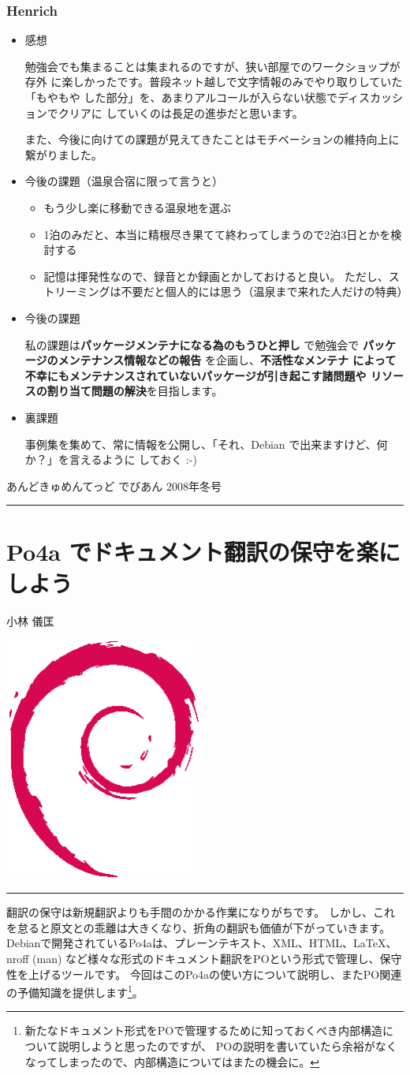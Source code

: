 \documentclass[mingoth,a4paper]{jsarticle}
\renewcommand{\dancersection}[2]{%
\newpage
あんどきゅめんてっど でびあん 2008年冬号
%
\vspace{0.1mm}\\
{\color{dancerlightblue}\rule{\hsize}{2mm}}

%
%
\begin{minipage}[t]{0.6\hsize}
\color{dancerdarkblue}
\vspace{1cm}
\section{#1}
\hfill{}#2\\
\end{minipage}
\begin{minipage}[t]{0.4\hsize}
\vspace{-2cm}
\hfill{}\includegraphics[height=8cm]{image200502/openlogo-nd.eps}\\
\vspace{-5cm}
\end{minipage}
%
%
{\color{dancerdarkblue}\rule{0.74\hsize}{2mm}}
%
\vspace{2cm}
}
\begin{document}
\subsubsection{Henrich}
\begin{itemize}
\item 感想

勉強会でも集まることは集まれるのですが、狭い部屋でのワークショップが存外
に楽しかったです。普段ネット越しで文字情報のみでやり取りしていた「もやもや
した部分」を、あまりアルコールが入らない状態でディスカッションでクリアに
していくのは長足の進歩だと思います。

また、今後に向けての課題が見えてきたことはモチベーションの維持向上に繋がりました。


\item 今後の課題（温泉合宿に限って言うと）

\begin{itemize}
\item もう少し楽に移動できる温泉地を選ぶ
\item 1泊のみだと、本当に精根尽き果てて終わってしまうので2泊3日とかを検討する
\item 記憶は揮発性なので、録音とか録画とかしておけると良い。
ただし、ストリーミングは不要だと個人的には思う（温泉まで来れた人だけの特典）
\end{itemize}

\item 今後の課題

私の課題は{\bf パッケージメンテナになる為のもうひと押し} で勉強会で
{\bf パッケージのメンテナンス情報などの報告} を企画し、{\bf 不活性なメンテナ
によって不幸にもメンテナンスされていないパッケージが引き起こす諸問題や
リソースの割り当て問題の解決}を目指します。

\item 裏課題

事例集を集めて、常に情報を公開し、「それ、Debian で出来ますけど、何か？」を言えるように
しておく :-)
\end{itemize}


\dancersection{Po4a でドキュメント翻訳の保守を楽にしよう}{小林 儀匡}
\label{sec:po4a}

翻訳の保守は新規翻訳よりも手間のかかる作業になりがちです。
しかし、これを怠ると原文との乖離は大きくなり、折角の翻訳も価値が下がっていきます。
Debianで開発されているPo4aは、プレーンテキスト、XML、HTML、LaTeX、nroff (man)
など様々な形式のドキュメント翻訳をPOという形式で管理し、保守性を上げるツールです。
今回はこのPo4aの使い方について説明し、またPO関連の予備知識を提供します\footnote{%
新たなドキュメント形式をPOで管理するために知っておくべき内部構造について説明しようと思ったのですが、
POの説明を書いていたら余裕がなくなってしまったので、内部構造についてはまたの機会に。}。
\end{document}
